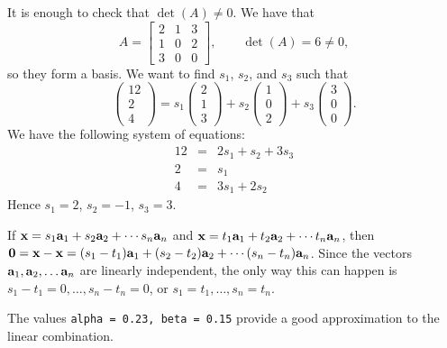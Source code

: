 \vspace{2mm}
It is enough to check that $\det(A)\neq 0$. We have that
$$
A = \left[\begin{array}{ccc} 2 & 1 & 3 \\ 1& 0 & 2 \\ 3 & 0 & 0 \end{array}\right],\qquad
\det(A) = 6\neq 0,
$$
so they form a basis. We want to find $s_1$, $s_2$, and $s_3$ such that
$$
\left(\begin{array}{c} 12 \\ 2 \\ 4\end{array}\right) = s_1\left(\begin{array}{c} 2 \\ 1 \\ 3\end{array}\right) + s_2\left(\begin{array}{c} 1 \\ 0 \\ 2\end{array}\right) + s_3\left(\begin{array}{c} 3 \\ 0 \\ 0\end{array}\right).
$$
We have the following system of equations:
\begin{eqnarray*}
  12 &=& 2s_1 + s_2 + 3s_3\\
	2 &=& s_1 \\
	4 &=& 3s_1 + 2s_2
\end{eqnarray*}
% 
Hence $s_1=2$, $s_2 = -1$, $s_3 = 3$.

\vspace{2mm}
If $\xx=s_1\aa_1 + s_2\aa_2 + \cdots s_n\aa_n$ and
$\xx=t_1\aa_1 + t_2\aa_2 + \cdots t_n\aa_n$, then $\zv=\xx-\xx
=(s_1-t_1)\aa_1 + (s_2-t_2)\aa_2 + \cdots (s_n-t_n)\aa_n$. Since the vectors
$\aa_1, \aa_2, \ldots \aa_n$ are linearly independent, the only way this
can happen is $s_1-t_1=0, \ldots, s_n-t_n=0$, or $s_1=t_1, \ldots, s_n=t_n.$

\vspace{2mm}
The values {\tt alpha = 0.23, beta = 0.15} provide a good approximation to the linear combination.

